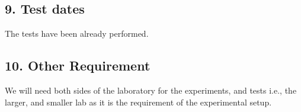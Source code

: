 \documentclass[A4,11pt]{article}
\begin{document}
\subsection*{9. Test dates} 
The tests have been already performed.

\subsection*{10. Other Requirement}
We will need both sides of the laboratory for the experiments, and tests i.e., the larger, and smaller lab as it is the requirement of the experimental setup.
\end{document}

